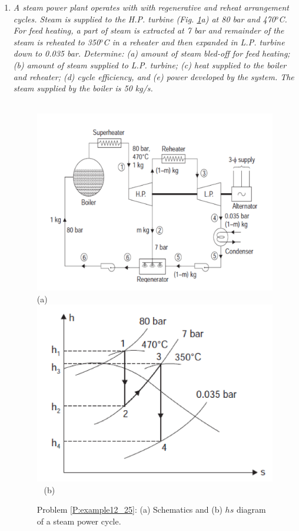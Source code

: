 \begin{enumerate}
\item\label{P:example12_25} {\it A steam power plant operates with with regenerative and reheat arrangement cycles. Steam is supplied to the H.P. turbine (Fig. \ref{example12_25}a) at 80 bar and 470$^{o}$C.  For feed heating, a part of steam is extracted at 7 bar and remainder of the steam is reheated to 350$^{o}$C in a reheater and then expanded in L.P. turbine down to 0.035 bar. Determine: (a) amount of steam bled-off for feed heating; (b) amount of steam supplied to L.P. turbine; (c) heat supplied to the boiler and reheater; (d) cycle efficiency, and (e) power developed by the system. The steam supplied by the boiler is 50 kg/s.}
   \begin{figure}[h]
    \begin{center}
    \vbox{
     \hbox{\hspace{1cm}
      \includegraphics[width=12.cm,clip]{./../../ThermalEngines/Pics/Exemple12_25a_Rajput}}
     \hbox{\hspace{7.5cm}(a)}
     \hbox{\hspace{1.cm}
      \includegraphics[width=12.cm,clip]{./../../ThermalEngines/Pics/Exemple12_25b_Rajput}
      }
     \hbox{\hspace{7.5cm}(b)}}
     \caption{Problem \ref{P:example12_25}: (a) Schematics and (b) $hs$ diagram of a steam power cycle.}
     \label{example12_25}
     \end{center}
   \end{figure}
 


\end{enumerate}
